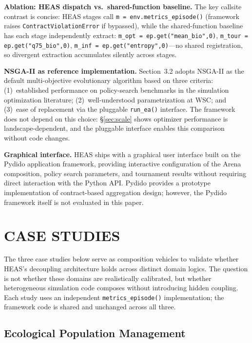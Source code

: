 \documentclass{wscpaperproc}
\begin{document}
\textbf{Ablation: HEAS dispatch vs.\ shared-function baseline.}
The key callsite contrast is concise: HEAS stages call
\texttt{m = env.metrics\_episode()} (framework raises
\texttt{ContractViolationError} if bypassed), while the
shared-function baseline has each stage independently extract:
\texttt{m\_opt = ep.get("mean\_bio",0)},
\texttt{m\_tour = ep.get("q75\_bio",0)},
\texttt{m\_inf = ep.get("entropy",0)}---no shared registration,
so divergent extraction accumulates silently across stages.

\textbf{NSGA-II as reference implementation.} Section~3.2 adopts NSGA-II as the
default multi-objective evolutionary algorithm based on three criteria:
(1)~established performance on policy-search benchmarks in the simulation
optimization literature; (2)~well-understood parametrization at WSC; and
(3)~ease of replacement via the pluggable \texttt{run\_ea()} interface. The
framework does not depend on this choice: \S\ref{sec:scale} shows optimizer performance is landscape-dependent, and the pluggable interface enables this comparison without code changes.

\textbf{Graphical interface.} HEAS ships with a graphical user interface
built on the Pydido application framework, providing interactive configuration
of the Arena composition, policy search parameters, and tournament results
without requiring direct interaction with the Python API.
Pydido provides a prototype implementation of contract-based aggregation design;
however, the Pydido framework itself is not evaluated in this paper.

\section{CASE STUDIES}

The three case studies below serve as composition vehicles to validate whether HEAS's decoupling architecture holds across distinct domain logics. The question is not whether these domains are realistically calibrated, but whether heterogeneous simulation code composes without introducing hidden coupling. Each study uses an independent \texttt{metrics\_episode()} implementation; the framework code is shared and unchanged across all three.

\subsection{Ecological Population Management}
\end{document}
